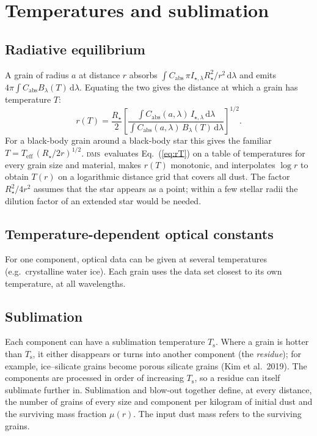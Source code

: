 \documentclass[11pt,a4paper]{article}
\newcommand{\dms}{\textsc{dms}}
\newcommand{\dd}{\mathrm{d}}
\begin{document}
\section{Temperatures and sublimation}
\label{sec:temp}

\subsection{Radiative equilibrium}

A grain of radius $a$ at distance $r$ absorbs
$\int C_\mathrm{abs}\,\pi I_{\star,\lambda}R_\star^2/r^2\,\dd\lambda$ and emits
$4\pi\int C_\mathrm{abs}B_\lambda(T)\,\dd\lambda$. Equating the two gives the distance at which a
grain has temperature $T$:
\begin{equation}
r(T) = \frac{R_\star}{2}\left[\frac{\int C_\mathrm{abs}(a,\lambda)\,I_{\star,\lambda}\,\dd\lambda}
                                     {\int C_\mathrm{abs}(a,\lambda)\,B_\lambda(T)\,\dd\lambda}\right]^{1/2}.
\label{eq:rT}
\end{equation}
For a black-body grain around a black-body star this gives the familiar
$T=T_\mathrm{eff}\,(R_\star/2r)^{1/2}$. \dms\ evaluates Eq.~(\ref{eq:rT}) on a table of
temperatures for every grain size and material, makes $r(T)$ monotonic, and interpolates
$\log r$ to obtain $T(r)$ on a logarithmic distance grid that covers all dust. The factor
$R_\star^2/4r^2$ assumes that the star appears as a point; within a few stellar radii the dilution
factor of an extended star would be needed.

\subsection{Temperature-dependent optical constants}

For one component, optical data can be given at several temperatures (e.g.\ crystalline water
ice). Each grain uses the data set closest to its own temperature, at all wavelengths.

\subsection{Sublimation}
\label{sec:subl}

Each component can have a sublimation temperature $T_\mathrm{s}$. Where a grain is hotter than
$T_\mathrm{s}$, it either disappears or turns into another component (the \emph{residue}); for
example, ice--silicate grains become porous silicate grains (Kim et al.\ 2019). The components are
processed in order of increasing $T_\mathrm{s}$, so a residue can itself sublimate further in.
Sublimation and blow-out together define, at every distance, the number of grains of every size
and component per kilogram of initial dust and the surviving mass fraction $\mu(r)$. The input
dust mass refers to the surviving grains.
\end{document}
